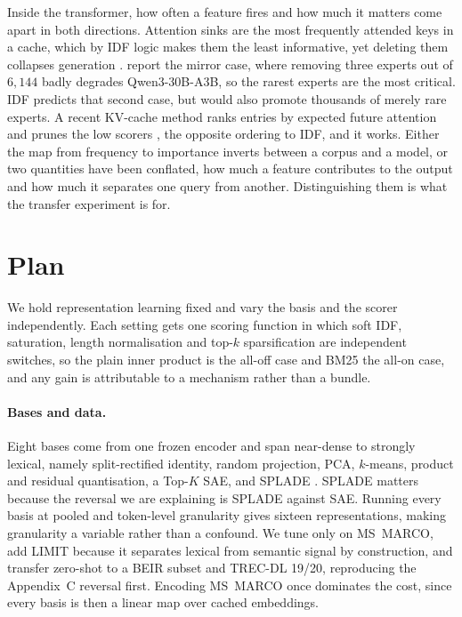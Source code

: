 \documentclass[11pt]{article}
\begin{document}
Inside the transformer, how often a feature fires and how much it matters come
apart in both directions. Attention sinks are the most frequently attended keys
in a cache, which by IDF logic makes them the least informative, yet deleting
them collapses generation \citep{xiao2024streamingllm}. \citet{su2026superexperts}
report the mirror case, where removing three experts out of $6{,}144$ badly
degrades Qwen3-30B-A3B, so the rarest experts are the most critical. IDF predicts
that second case, but would also promote thousands of merely rare experts. A
recent KV-cache method ranks entries by expected future attention and prunes the
low scorers \citep{devoto2025expectedattention}, the opposite ordering to IDF,
and it works. Either the map from frequency to importance inverts between a
corpus and a model, or two quantities have been conflated, how much a feature
contributes to the output and how much it separates one query from another.
Distinguishing them is what the transfer experiment is for.

\section{Plan}

We hold representation learning fixed and vary the basis and the scorer
independently. Each setting gets one scoring function in which soft IDF,
saturation, length normalisation and top-$k$ sparsification are independent
switches, so the plain inner product is the all-off case and BM25 the all-on
case, and any gain is attributable to a mechanism rather than a bundle.

\paragraph{Bases and data.} Eight bases come from one frozen encoder and span
near-dense to strongly lexical, namely split-rectified identity, random
projection, PCA, $k$-means, product and residual quantisation, a Top-$K$ SAE,
and SPLADE \citep{formal2021splade}. SPLADE matters because the reversal we are
explaining is SPLADE against SAE. Running every basis at pooled and token-level granularity
gives sixteen representations, making granularity a variable rather than a
confound. We tune only on MS~MARCO, add LIMIT \citep{weller2025limit}
because it separates lexical from semantic signal by construction, and transfer
zero-shot to a BEIR subset and TREC-DL 19/20, reproducing the Appendix~C reversal
first. Encoding MS~MARCO once dominates the cost, since every basis is then a
linear map over cached embeddings.
\end{document}
